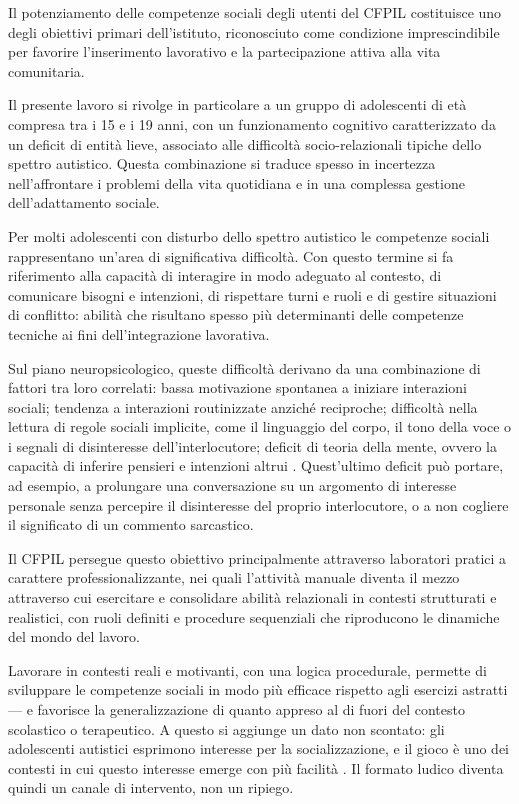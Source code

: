 \documentclass[12pt]{report}
\begin{document}
Il potenziamento delle competenze sociali degli utenti del CFPIL costituisce uno degli obiettivi primari dell'istituto, riconosciuto come condizione imprescindibile per favorire l'inserimento lavorativo e la partecipazione attiva alla vita comunitaria.

Il presente lavoro si rivolge in particolare a un gruppo di adolescenti di età compresa tra i 15 e i 19 anni, con un funzionamento cognitivo caratterizzato da un deficit di entità lieve, associato alle difficoltà socio-relazionali tipiche dello spettro autistico. Questa combinazione si traduce spesso in incertezza nell'affrontare i problemi della vita quotidiana e in una complessa gestione dell'adattamento sociale.

Per molti adolescenti con disturbo dello spettro autistico le competenze sociali rappresentano un'area di significativa difficoltà. Con questo termine si fa riferimento alla capacità di interagire in modo adeguato al contesto, di comunicare bisogni e intenzioni, di rispettare turni e ruoli e di gestire situazioni di conflitto: abilità che risultano spesso più determinanti delle competenze tecniche ai fini dell'integrazione lavorativa.

Sul piano neuropsicologico, queste difficoltà derivano da una combinazione di fattori tra loro correlati: bassa motivazione spontanea a iniziare interazioni sociali; tendenza a interazioni routinizzate anziché reciproche; difficoltà nella lettura di regole sociali implicite, come il linguaggio del corpo, il tono della voce o i segnali di disinteresse dell'interlocutore; deficit di teoria della mente, ovvero la capacità di inferire pensieri e intenzioni altrui \cite{mesibov2005}. Quest'ultimo deficit può portare, ad esempio, a prolungare una conversazione su un argomento di interesse personale senza percepire il disinteresse del proprio interlocutore, o a non cogliere il significato di un commento sarcastico.

Il CFPIL persegue questo obiettivo principalmente attraverso laboratori pratici a carattere professionalizzante, nei quali l'attività manuale diventa il mezzo attraverso cui esercitare e consolidare abilità relazionali in contesti strutturati e realistici, con ruoli definiti e procedure sequenziali che riproducono le dinamiche del mondo del lavoro.

Lavorare in contesti reali e motivanti, con una logica procedurale, permette di sviluppare le competenze sociali in modo più efficace rispetto agli esercizi astratti --- e favorisce la generalizzazione di quanto appreso al di fuori del contesto scolastico o terapeutico.
A questo si aggiunge un dato non scontato: gli adolescenti autistici esprimono interesse per la socializzazione, e il gioco è uno dei contesti in cui questo interesse emerge con più facilità \cite{walsh2024}. Il formato ludico diventa quindi un canale di intervento, non un ripiego.
\end{document}
